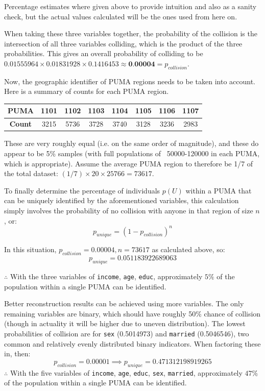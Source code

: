 \documentclass[12pt]{article}
\begin{document}
Percentage estimates where given above to provide intuition and also as a sanity check, but the actual values calculated will be the ones used from here on.

When taking these three variables together, the probability of the collision is the intersection of all three variables colliding, which is the product of the three probabilities. This gives an overall probability of colliding to be $0.01555964 \times 0.01831928 \times 0.1416453 \approx \textbf{0.00004} = p_{collision}$.

Now, the geographic identifier of PUMA regions needs to be taken into account. Here is a summary of counts for each PUMA region.
\begin{center}
\begin{tabular}{|c|ccccccc|}
\hline
\textbf{PUMA} & 1101 & 1102 & 1103 & 1104 & 1105 & 1106 & 1107\\\hline
\textbf{Count} & 3215 & 5736 & 3728 & 3740 & 3128 & 3236 & 2983\\ \hline
\end{tabular}
\end{center}
These are very roughly equal (i.e. on the same order of magnitude), and these do appear to be 5\% samples (with full populations of ~50000-120000 in each PUMA, which is appropriate). Assume the average PUMA region to therefore be 1/7 of the total dataset: $(1/7) \times 20 \times 25766 = 73617$.

To finally determine the percentage of individuals $p(U)$ within a PUMA that can be uniquely identified by the aforementioned variables, this calculation simply involves the probability of no collision with anyone in that region of size $n$, or:
\[p_{unique} = (1-p_{collision})^{n}\]

In this situation, $p_{collision} = 0.00004, n = 73617$ as calculated above, so:
\[p_{unique} = 0.051183922689063\]

$\therefore$ With the three variables of \texttt{income}, \texttt{age}, \texttt{educ}, approximately $\boxed{5\%}$ of the population within a single PUMA can be identified.

Better reconstruction results can be achieved using more variables. The only remaining variables are binary, which should have roughly 50\% chance of collision (though in actuality it will be higher due to uneven distribution). The lowest probabilities of collision are for \texttt{sex} (0.5014973) and \texttt{married} (0.5046546), two common and relatively evenly distributed binary indicators. When factoring these in, then:
\[p_{collision} = 0.00001 \implies p_{unique} = 0.471312198919265\]
$\therefore$ With the five variables of \texttt{income}, \texttt{age}, \texttt{educ}, \texttt{sex}, \texttt{married}, approximately $\boxed{47\%}$ of the population within a single PUMA can be identified.
\end{document}

